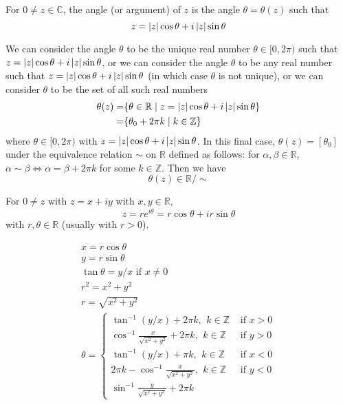 \begin{defn}
For $0\neq z \in \mathbb{C}$, the angle (or argument) of $z$ is the angle $\theta = \theta (z)$ such that \[z = \left| z \right| \cos \theta +i \left| z \right|\sin\theta\]

We can consider the angle $\theta$ to be the unique real number $\theta \in [0,2\pi)$ such that \(z = \left| z \right| \cos \theta +i \left| z \right|\sin\theta\), or we can consider the angle $\theta$ to be any real number such that \(z = \left| z \right| \cos \theta +i \left| z \right|\sin\theta\) (in which case $\theta$ is not unique), or we can consider $\theta$ to be the set of all such real numbers 
\begin{align*}
    \theta (z) =& \{\theta \in \mathbb{R} \mid z = \left| z \right| \cos \theta +i \left| z \right|\sin\theta\} \\
    =& \{\theta_0 + 2\pi k \mid k\in\mathbb{Z}\}
\end{align*}
where $\theta \in [0,2\pi)$ with \(z = \left| z \right| \cos \theta +i \left| z \right|\sin\theta\). In this final case, $\theta (z) = [\theta_0]$ under the equivalence relation $\sim$ on $\mathbb{R}$ defined as follows: for $\alpha,\beta \in \mathbb{R}$, $\alpha\sim \beta \Longleftrightarrow \alpha = \beta + 2\pi k$ for some $k\in\mathbb{Z}$. Then we have \[\theta(z) \in \mathbb{R} / \sim\]
\end{defn}

\begin{note}
For $0\neq z$ with $z = x+iy$ with $x,y\in\mathbb{R}$, \[z = re^{i\theta} = r\cos \theta + ir\sin\theta\] with $r,\theta \in \mathbb{R}$ (usually with $r>0$).

\begin{gather*}
    x = r\cos\theta \\
    y = r\sin\theta \\
    \tan \theta = y/x \text{ if }x\neq 0\\
    r^2 = x^2 + y^2\\
    r = \sqrt{x^2+y^2}\\
    \theta = \begin{cases}
    \tan^{-1} (y/x) + 2\pi k, \ \, k\in\mathbb{Z} & \text{ if } x > 0\\
    \cos^{-1} \frac{x}{\sqrt{x^2+y^2}}  + 2\pi k, \ \, k\in\mathbb{Z} & \text{ if } y > 0\\
    \tan^{-1} (y/x) + \pi k, \ \, k\in\mathbb{Z} & \text{ if } x < 0\\
    2\pi k - \cos^{-1} \frac{x}{\sqrt{x^2+y^2}} , \ \, k\in\mathbb{Z} & \text{ if } y < 0\\
    \sin^{-1} \frac{y}{\sqrt{x^2+y^2}} + 2\pi k
    \end{cases}
\end{gather*}
\end{note}

